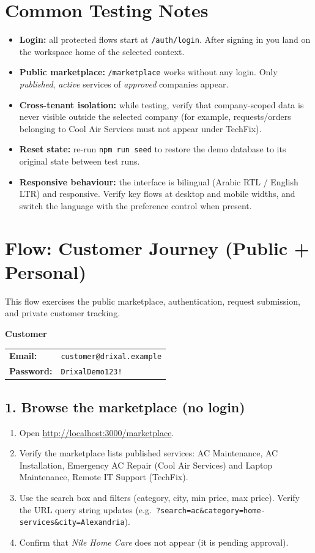\documentclass[11pt,a4paper]{article}
\makeatletter
\newcommand{\account}[3]{%
  \begin{tcolorbox}[colback=drixalsurface, colframe=drixalblue, boxrule=0.8pt, left=10pt, right=10pt, top=8pt, bottom=8pt, breakable]
    \textbf{\color{drixalblue}#1}\\
    \begin{tabular}{@{}ll}
      \textbf{Email:} & \texttt{#2} \\
      \textbf{Password:} & \texttt{#3} \\
    \end{tabular}
  \end{tcolorbox}
}
\makeatother
\begin{document}
\section{Common Testing Notes}
\label{sec:common}

\begin{itemize}[leftmargin=2em, itemsep=2pt]
  \item \textbf{Login:} all protected flows start at \texttt{/auth/login}. After signing in you land on the workspace home of the selected context.
  \item \textbf{Public marketplace:} \texttt{/marketplace} works without any login. Only \emph{published}, \emph{active} services of \emph{approved} companies appear.
  \item \textbf{Cross-tenant isolation:} while testing, verify that company-scoped data is never visible outside the selected company (for example, requests/orders belonging to Cool Air Services must not appear under TechFix).
  \item \textbf{Reset state:} re-run \texttt{npm run seed} to restore the demo database to its original state between test runs.
  \item \textbf{Responsive behaviour:} the interface is bilingual (Arabic RTL / English LTR) and responsive. Verify key flows at desktop and mobile widths, and switch the language with the preference control when present.
\end{itemize}

\section{Flow: Customer Journey (Public + Personal)}
\label{sec:flow-customer}

This flow exercises the public marketplace, authentication, request submission, and private customer tracking.

\account{Customer}{customer@drixal.example}{DrixalDemo123!}

\subsection{1. Browse the marketplace (no login)}
\begin{enumerate}[leftmargin=2em, itemsep=2pt]
  \item Open \url{http://localhost:3000/marketplace}.
  \item Verify the marketplace lists published services: AC Maintenance, AC Installation, Emergency AC Repair (Cool Air Services) and Laptop Maintenance, Remote IT Support (TechFix).
  \item Use the search box and filters (category, city, min price, max price). Verify the URL query string updates (e.g.\ \texttt{?search=ac\&category=home-services\&city=Alexandria}).
  \item Confirm that \emph{Nile Home Care} does not appear (it is pending approval).
\end{enumerate}
\end{document}
